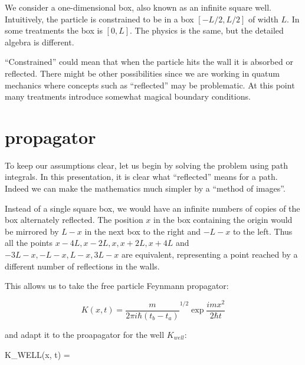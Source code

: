 \documentclass[a4paper, 12pt]{article}
\begin{document}
We consider a one-dimensional box, also known as an infinite square well. Intuitively, the particle is constrained to be in a box $[-L/2, L/2]$ of width $L$. In some treatments the box is $[0, L]$. The physics is the same, but the detailed algebra is different.

``Constrained'' could mean that when the particle hits the wall it is absorbed or reflected. There might be other possibilities since we are working in quatum mechanics where concepts such as ``reflected'' may be problematic. At this point many treatments introduce somewhat magical boundary conditions. 

\section{propagator}
To keep our assumptions clear, let us begin by solving the problem using path integrals. In this presentation, it is clear what ``reflected'' means for a path. Indeed we can make the mathematics much simpler by a ``method of images''.

Instead of a single square box, we would have an infinite numbers of copies of the box alternately reflected. The position $x$ in the box containing the origin would be mirrored by $L - x$ in the next box to the right and $-L -x$ to the left. Thus all the points $x-4L, x-2L, x, x+2L, x+4L$ and $-3L-x, -L-x, L-x, 3L-x$ are equivalent, representing a point reached by a different number of reflections in the walls.

This allows us to take the free particle Feynmann propagator:

$$K(x,t) = \frac{m}{2\pi i\hbar(t_b - t_a)}^{1/2}\exp{\frac{imx^2}{2\hbar t}}$$

and adapt it to the proapagator for the well $K_{well}$:

$$K_{WELL}(x, t) = \sum
\end{document}
